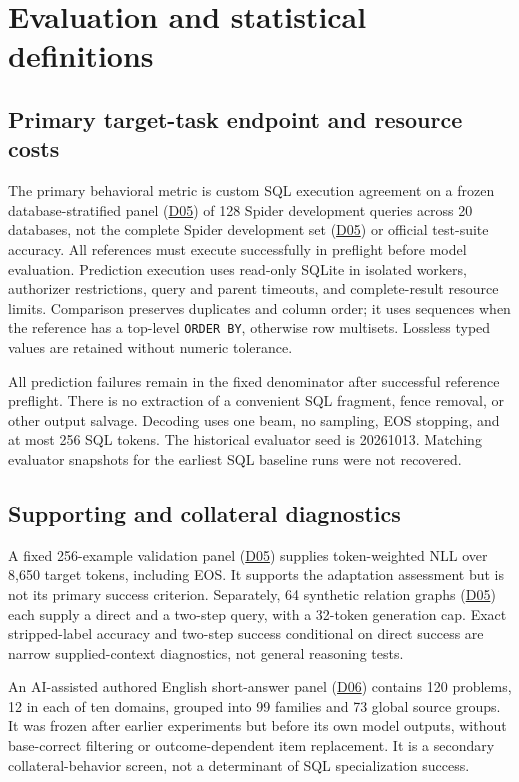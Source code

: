 \documentclass[10pt,letterpaper]{article}
\DeclareRobustCommand{\dataset}[1]{\hyperlink{dataset-#1}{\textnormal{#1}}}
\begin{document}
\section{Evaluation and statistical definitions}
\label{sec:evaluation}

\subsection{Primary target-task endpoint and resource costs}

The primary behavioral metric is custom SQL execution agreement on a frozen
database-stratified panel (\dataset{D05}) of 128 Spider development queries across 20
databases, not the complete Spider development set (\dataset{D05}) or official test-suite
accuracy. All references must execute successfully in preflight before model
evaluation. Prediction execution uses read-only SQLite in isolated workers,
authorizer restrictions, query and parent timeouts, and complete-result
resource limits. Comparison preserves duplicates and column order; it uses
sequences when the reference has a top-level \texttt{ORDER BY}, otherwise
row multisets. Lossless typed values are retained without numeric tolerance.

All prediction failures remain in the fixed denominator after successful
reference preflight. There is no extraction of a convenient SQL fragment,
fence removal, or other output salvage. Decoding uses one beam, no sampling,
EOS stopping, and at most 256 SQL tokens. The historical evaluator seed is
20261013. Matching evaluator snapshots for the earliest SQL baseline runs
were not recovered.

\subsection{Supporting and collateral diagnostics}

A fixed 256-example validation panel (\dataset{D05}) supplies token-weighted NLL over 8,650
target tokens, including EOS. It supports the adaptation assessment but is
not its primary success criterion. Separately, 64 synthetic relation graphs (\dataset{D05})
each supply a direct and a two-step query, with a 32-token generation cap.
Exact stripped-label accuracy and two-step success conditional on direct
success are narrow supplied-context diagnostics, not general reasoning tests.

An AI-assisted authored English short-answer panel (\dataset{D06}) contains 120
problems, 12 in each of ten domains, grouped into 99 families and 73 global
source groups. It was frozen after earlier experiments but before its own
model outputs, without base-correct filtering or outcome-dependent item
replacement. It is a secondary collateral-behavior screen, not a determinant
of SQL specialization success.
\end{document}

